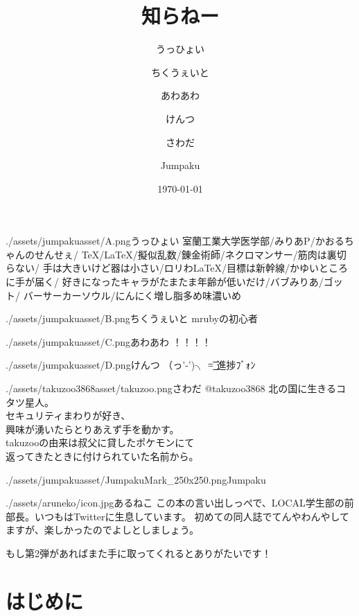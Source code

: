 \documentclass[autodetect-engine,dvipdfmx-if-dvi,ja=standard,a5paper,10.5pt,twoside,openany,layout=v2]{bxjsbook}
\title{知らねー}
\author{うっひょい \and ちくうぇいと \and あわあわ \and けんつ \and さわだ \and Jumpaku}
\date{\today}
\newcommand{\articlepath}{./articles}
\newcommand{\assetspath}{./assets}
\newcommand{\jumpakuasset}{\assetspath/jumpakuasset}
\newcommand{\takuzooasset}{\assetspath/takuzoo3868asset}
\begin{document}
\frontmatter
\maketitle
\begin{myintroduce}{\jumpakuasset/A.png}{うっひょい}
  室蘭工業大学医学部/みりあP/かおるちゃんのせんせぇ/
  TeX/LaTeX/擬似乱数/錬金術師/ネクロマンサー/筋肉は裏切らない/
  手は大きいけど器は小さい/ロリわLaTeX/目標は新幹線/かゆいところに手が届く/
  好きになったキャラがたまたま年齢が低いだけ/バブみりあ/ゴット/
  バーサーカーソウル/にんにく増し脂多め味濃いめ
\end{myintroduce}
\begin{myintroduce}{\jumpakuasset/B.png}{ちくうぇいと}
  mrubyの初心者
\end{myintroduce}
\begin{myintroduce}{\jumpakuasset/C.png}{あわあわ}
  ！！！！
\end{myintroduce}
\begin{myintroduce}{\jumpakuasset/D.png}{けんつ}
  （っ'-')╮ =͟͟͞͞ 進捗ﾌﾞｫﾝ
\end{myintroduce}
\begin{myintroduce}{\takuzooasset/takuzoo.png}{さわだ @takuzoo3868}
    北の国に生きるコタツ星人。\\
    セキュリティまわりが好き、\\
    興味が湧いたらとりあえず手を動かす。\\
    takuzooの由来は叔父に貸したポケモンにて\\
    返ってきたときに付けられていた名前から。
\end{myintroduce}
\begin{myintroduce}{\jumpakuasset/JumpakuMark_250x250.png}{Jumpaku}

\end{myintroduce}

\begin{myintroduce}{./assets/aruneko/icon.jpg}{あるねこ}
  この本の言い出しっぺで、LOCAL学生部の前部長。いつもはTwitterに生息しています。
  初めての同人誌でてんやわんやしてますが、楽しかったのでよしとしましょう。
  
  もし第2弾があればまた手に取ってくれるとありがたいです！
\end{myintroduce}

\chapter{はじめに}

\end{document}
